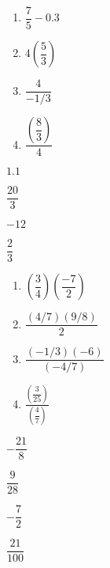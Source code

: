 \documentclass[11pt]{article}
\begin{document}
\begin{multicols}{4}
\begin{enumerate}
\setcounter{enumi}{\theenumCount}
\item $\dfrac{7}{5} - 0.3$
\item $4 \left( \dfrac{5}{3} \right)$
\item $\dfrac{4}{-1/3}$
\item $\dfrac{\left( \dfrac{8}{3} \right)}{4}$
\setcounter{enumCount}{\theenumi}
\end{enumerate}
\end{multicols}

\begin{multicols}{4}
\color{blue}
\begin{description}
\item \center $1.1$
\item \center $\dfrac{20}{3}$
\item \center $-12$
\item \center $\dfrac{2}{3}$
\setcounter{enumCount}{\theenumi}
\end{description}
\end{multicols}

\vfill



\begin{multicols}{4}
\begin{enumerate}
\setcounter{enumi}{\theenumCount}
\item $\left(\dfrac{3}{4} \right) \left( \dfrac{-7}{2} \right)$
\item $\dfrac{(4/7)(9/8)}{2}$
\item $\dfrac{(-1/3)(-6)}{(-4/7)}$
\item $\frac{\left(\dfrac{3}{25}\right)}{ \left(\dfrac{4}{7}\right)}$
\setcounter{enumCount}{\theenumi}
\end{enumerate}
\end{multicols}



\begin{multicols}{4}
\color{blue}
\begin{description}
\item \center $-\dfrac{21}{8}$
\item \center $\dfrac{9}{28}$
\item \center $-\dfrac{7}{2}$
\item \center $\dfrac{21}{100}$
\setcounter{enumCount}{\theenumi}
\end{description}
\end{multicols}
\vfill
\end{document}
